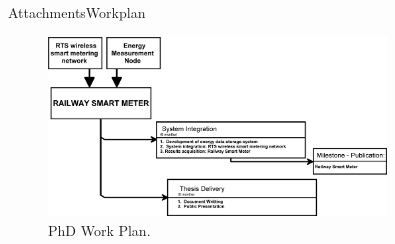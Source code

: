 \begin{frame}{Attachments}{Workplan}
\begin{figure}[ht!]
	\centering
	\includegraphics[width=0.8\textwidth,keepaspectratio]{figures/40.Method/workplan2}
	\caption{PhD Work Plan.}
\end{figure}
\end{frame}